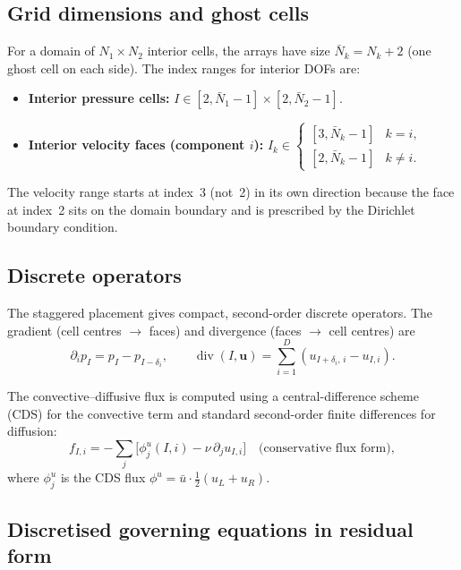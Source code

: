 \documentclass[11pt]{article}
\newcommand{\vect}[1]{\bm{#1}}
\begin{document}
\subsection{Grid dimensions and ghost cells}

For a domain of $N_1\times N_2$ interior cells, the arrays have size
$\bar N_k = N_k + 2$ (one ghost cell on each side).  The index ranges
for interior DOFs are:

\begin{itemize}
  \item \textbf{Interior pressure cells:}
    $I\in[2,\bar N_1{-}1]\times[2,\bar N_2{-}1]$.
  \item \textbf{Interior velocity faces (component $i$):}
    $I_k\in\begin{cases}[3,\bar N_k{-}1]&k=i,\\[2pt][2,\bar N_k{-}1]&k\neq i.\end{cases}$
\end{itemize}

\noindent
The velocity range starts at index~3 (not~2) in its own direction
because the face at index~2 sits on the domain boundary and is
prescribed by the Dirichlet boundary condition.

\subsection{Discrete operators}

The staggered placement gives compact, second-order discrete operators.
The gradient (cell centres $\to$ faces) and divergence (faces $\to$
cell centres) are
\begin{equation}\label{eq:grad_div}
  \partial_i p_I = p_I - p_{I-\delta_i},
  \qquad
  \operatorname{div}(I, \vect{u}) = \sum_{i=1}^{D}(u_{I+\delta_i,\,i} - u_{I,i}).
\end{equation}

The convective--diffusive flux is computed using a central-difference scheme
(CDS) for the convective term and standard second-order finite differences
for diffusion:
\begin{equation}
  f_{I,i} = -\sum_j\bigl[\phi^u_{j}(I,i) - \nu\,\partial_j u_{I,i}\bigr]
    \quad\text{(conservative flux form)},
\end{equation}
where $\phi^u_j$ is the CDS flux $\phi^u = \bar u\cdot\tfrac{1}{2}(u_L+u_R)$.

\subsection{Discretised governing equations in residual form}
\end{document}
